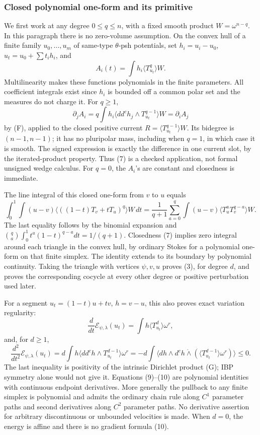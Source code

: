 \documentclass[
  11pt,
]{article}
\begin{document}
\subsubsection{Closed polynomial one-form and its
primitive}\label{closed-polynomial-one-form-and-its-primitive}

We first work at any degree \(0\leq q\leq n\), with a fixed smooth
product \(W=\omega^{n-q}\). In this paragraph there is no zero-volume
assumption. On the convex hull of a finite family \(u_0,\ldots,u_m\) of
same-type \(\theta\)-psh potentials, set \(h_i=u_i-u_0\),
\(u_t=u_0+\sum t_i h_i\), and \[
A_i(t)=\int h_i\langle T_{u_t}^q\rangle W.
\] Multilinearity makes these functions polynomials in the finite
parameters. All coefficient integrals exist since \(h_i\) is bounded off
a common polar set and the measures do not charge it. For \(q\geq1\), \[
\partial_j A_i=q\int h_i\langle dd^ch_j\wedge T_{u_t}^{q-1}\rangle W
=\partial_i A_j
\tag{7}
\] by (F), applied to the closed positive current
\(R=\langle T_{u_t}^{q-1}\rangle W\). Its bidegree is \((n-1,n-1)\); it
has no pluripolar mass, including when \(q=1\), in which case it is
smooth. The signed expression is exactly the difference in one current
slot, by the iterated-product property. Thus (7) is a checked
application, not formal unsigned wedge calculus. For \(q=0\), the
\(A_i\)'s are constant and closedness is immediate.

The line integral of this closed one-form from \(v\) to \(u\) equals \[
\int_0^1\int (u-v)\langle((1-t)T_v+tT_u)^q\rangle W\,dt
=\frac1{q+1}\sum_{a=0}^q\int(u-v)\langle T_u^aT_v^{q-a}\rangle W.
\tag{8}
\] The last equality follows by the binomial expansion and
\(\binom qa\int_0^1t^a(1-t)^{q-a}dt=1/(q+1)\). Closedness (7) implies
zero integral around each triangle in the convex hull, by ordinary
Stokes for a polynomial one-form on that finite simplex. The identity
extends to its boundary by polynomial continuity. Taking the triangle
with vertices \(\psi,v,u\) proves (3), for degree \(d\), and proves the
corresponding cocycle at every other degree or positive perturbation
used later.

For a segment \(u_t=(1-t)u+tv\), \(h=v-u\), this also proves exact
variation regularity: \[
\frac d{dt}\mathcal{E}_{\psi,\lambda}(u_t)=\int h\langle T_{u_t}^d\rangle\omega^r,
\tag{9}
\] and, for \(d\geq1\), \[
\frac {d^2}{dt^2}\mathcal{E}_{\psi,\lambda}(u_t)
=d\int h\langle dd^ch\wedge T_{u_t}^{d-1}\rangle\omega^r
=-d\int\langle dh\wedge d^ch\dot\wedge
(\langle T_{u_t}^{d-1}\rangle\omega^r)\rangle\leq0.
\tag{10}
\] The last inequality is positivity of the intrinsic Dirichlet product
(G); IBP symmetry alone would not give it. Equations (9)--(10) are
polynomial identities with continuous endpoint derivatives. More
generally the pullback to any finite simplex is polynomial and admits
the ordinary chain rule along \(C^1\) parameter paths and second
derivatives along \(C^2\) parameter paths. No derivative assertion for
arbitrary discontinuous or unbounded velocities is made. When \(d=0\),
the energy is affine and there is no gradient formula (10).
\end{document}
